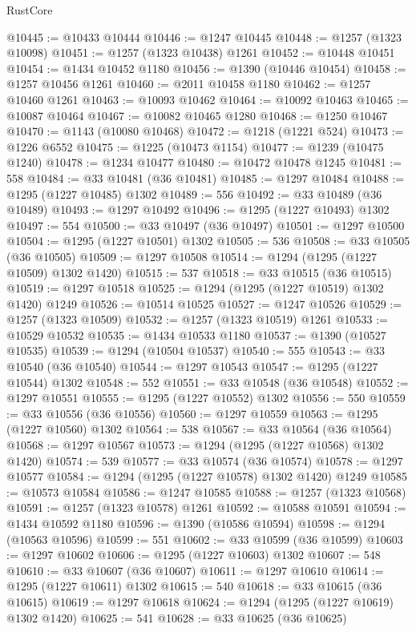 \begin{lexlean}{RustCore}
\begin{coremodule}
@10445 := @10433 @10444
@10446 := @1247 @10445
@10448 := @1257 (@1323 @10098)
@10451 := @1257 (@1323 @10438) @1261
@10452 := @10448 @10451
@10454 := @1434 @10452 @1180
@10456 := @1390 (@10446 @10454)
@10458 := @1257 @10456 @1261
@10460 := @2011 @10458 @1180
@10462 := @1257 @10460 @1261
@10463 := @10093 @10462
@10464 := @10092 @10463
@10465 := @10087 @10464
@10467 := @10082 @10465 @1280
@10468 := @1250 @10467
@10470 := @1143 (@10080 @10468)
@10472 := @1218 (@1221 @524)
@10473 := @1226 @6552
@10475 := @1225 (@10473 @1154)
@10477 := @1239 (@10475 @1240)
@10478 := @1234 @10477
@10480 := @10472 @10478 @1245
@10481 := 558
@10484 := @33 @10481 (@36 @10481)
@10485 := @1297 @10484
@10488 := @1295 (@1227 @10485) @1302
@10489 := 556
@10492 := @33 @10489 (@36 @10489)
@10493 := @1297 @10492
@10496 := @1295 (@1227 @10493) @1302
@10497 := 554
@10500 := @33 @10497 (@36 @10497)
@10501 := @1297 @10500
@10504 := @1295 (@1227 @10501) @1302
@10505 := 536
@10508 := @33 @10505 (@36 @10505)
@10509 := @1297 @10508
@10514 := @1294 (@1295 (@1227 @10509) @1302 @1420)
@10515 := 537
@10518 := @33 @10515 (@36 @10515)
@10519 := @1297 @10518
@10525 := @1294 (@1295 (@1227 @10519) @1302 @1420) @1249
@10526 := @10514 @10525
@10527 := @1247 @10526
@10529 := @1257 (@1323 @10509)
@10532 := @1257 (@1323 @10519) @1261
@10533 := @10529 @10532
@10535 := @1434 @10533 @1180
@10537 := @1390 (@10527 @10535)
@10539 := @1294 (@10504 @10537)
@10540 := 555
@10543 := @33 @10540 (@36 @10540)
@10544 := @1297 @10543
@10547 := @1295 (@1227 @10544) @1302
@10548 := 552
@10551 := @33 @10548 (@36 @10548)
@10552 := @1297 @10551
@10555 := @1295 (@1227 @10552) @1302
@10556 := 550
@10559 := @33 @10556 (@36 @10556)
@10560 := @1297 @10559
@10563 := @1295 (@1227 @10560) @1302
@10564 := 538
@10567 := @33 @10564 (@36 @10564)
@10568 := @1297 @10567
@10573 := @1294 (@1295 (@1227 @10568) @1302 @1420)
@10574 := 539
@10577 := @33 @10574 (@36 @10574)
@10578 := @1297 @10577
@10584 := @1294 (@1295 (@1227 @10578) @1302 @1420) @1249
@10585 := @10573 @10584
@10586 := @1247 @10585
@10588 := @1257 (@1323 @10568)
@10591 := @1257 (@1323 @10578) @1261
@10592 := @10588 @10591
@10594 := @1434 @10592 @1180
@10596 := @1390 (@10586 @10594)
@10598 := @1294 (@10563 @10596)
@10599 := 551
@10602 := @33 @10599 (@36 @10599)
@10603 := @1297 @10602
@10606 := @1295 (@1227 @10603) @1302
@10607 := 548
@10610 := @33 @10607 (@36 @10607)
@10611 := @1297 @10610
@10614 := @1295 (@1227 @10611) @1302
@10615 := 540
@10618 := @33 @10615 (@36 @10615)
@10619 := @1297 @10618
@10624 := @1294 (@1295 (@1227 @10619) @1302 @1420)
@10625 := 541
@10628 := @33 @10625 (@36 @10625)

\end{coremodule}
\end{lexlean}
